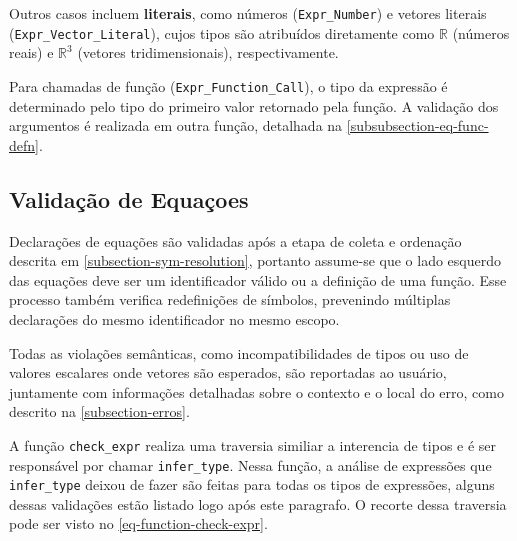 Outros casos incluem \textbf{literais}, como números (\verb"Expr_Number") e vetores literais (\verb"Expr_Vector_Literal"), cujos tipos são atribuídos diretamente como $\mathbb{R}$ (números reais) e $\mathbb{R}^3$ (vetores tridimensionais), respectivamente.



Para chamadas de função (\verb"Expr_Function_Call"), o tipo da expressão é determinado pelo tipo do primeiro valor retornado pela função. A validação dos argumentos é realizada em outra função, detalhada na \autoref{subsubsection-eq-func-defn}. %


\subsection{Validação de Equaçoes}



Declarações de equações são validadas após a etapa de coleta e ordenação descrita em \autoref{subsection-sym-resolution}, portanto assume-se que o lado esquerdo das equações deve ser um identificador válido ou a definição de uma função. Esse processo também verifica redefinições de símbolos, prevenindo múltiplas declarações do mesmo identificador no mesmo escopo.

Todas as violações semânticas, como incompatibilidades de tipos ou uso de valores escalares onde vetores são esperados, são reportadas ao usuário, juntamente com informações detalhadas sobre o contexto e o local do erro, como descrito na \autoref{subsection-erros}.

A função \verb"check_expr" realiza uma traversia similiar a interencia de tipos e é ser responsável por chamar \texttt{infer\_type}. Nessa função, a análise de expressões que \texttt{infer\_type} deixou de fazer são feitas para todas os tipos de expressões, alguns dessas validações estão listado logo após este paragrafo. O recorte dessa traversia pode ser visto no \autoref{eq-function-check-expr}.

